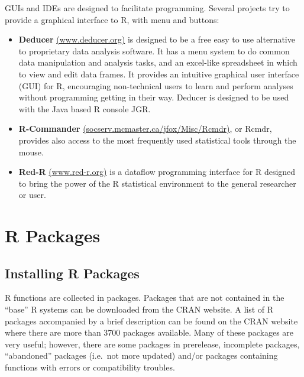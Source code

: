 \documentclass[]{book}
\providecommand{\tightlist}{%
  \setlength{\itemsep}{0pt}\setlength{\parskip}{0pt}}
\def\tightlist{}
\begin{document}
\clearpage

GUIs and IDEs are designed to facilitate programming. Several projects
try to provide a graphical interface to R, with menu and buttons:

\begin{itemize}
\tightlist
\item
  \textbf{Deducer} \href{http://www.deducer.org/}{(www.deducer.org)} is
  designed to be a free easy to use alternative to proprietary data
  analysis software. It has a menu system to do common data manipulation
  and analysis tasks, and an excel-like spreadsheet in which to view and
  edit data frames. It provides an intuitive graphical user interface
  (GUI) for R, encouraging non-technical users to learn and perform
  analyses without programming getting in their way. Deducer is designed
  to be used with the Java based R console JGR.
\item
  \textbf{R-Commander}
  \href{http://socserv.mcmaster.ca/jfox/Misc/Rcmdr/}{(socserv.mcmaster.ca/jfox/Misc/Rcmdr)},
  or Rcmdr, provides also access to the most frequently used statistical
  tools through the mouse.
\item
  \textbf{Red-R} \href{http://www.red-r.org/}{(www.red-r.org)} is a
  dataflow programming interface for R designed to bring the power of
  the R statistical environment to the general researcher or user.
\end{itemize}

\clearpage

\section{R Packages}\label{r-packages}

\subsection{Installing R Packages}\label{installing-r-packages}

R functions are collected in packages. Packages that are not contained
in the ``base'' R systems can be downloaded from the CRAN website. A
list of R packages accompanied by a brief description can be found on
the CRAN website where there are more than 3700 packages available. Many
of these packages are very useful; however, there are some packages in
prerelease, incomplete packages, ``abandoned'' packages (i.e.~not more
updated) and/or packages containing functions with errors or
compatibility troubles.
\end{document}
